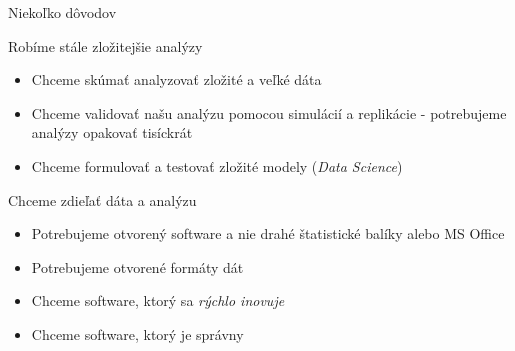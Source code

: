 \begin{frame}{Niekoľko dôvodov}
	\begin{block}{Robíme stále zložitejšie analýzy}
		\begin{itemize}
			\item Chceme skúmať analyzovať zložité a veľké dáta
			\item Chceme validovať našu analýzu pomocou simulácií a replikácie - potrebujeme analýzy opakovať tisíckrát
			\item Chceme formulovať a testovať zložité modely (\emph{Data Science})
		\end{itemize}
	\end{block}
	\begin{block}{Chceme zdieľať dáta a analýzu}
		\begin{itemize}
			\item Potrebujeme otvorený software a nie drahé štatistické balíky alebo MS Office
			\item Potrebujeme otvorené formáty dát
			\item Chceme software, ktorý sa \emph{rýchlo inovuje}
			\item Chceme software, ktorý je správny
		\end{itemize}
	\end{block}
\end{frame}


